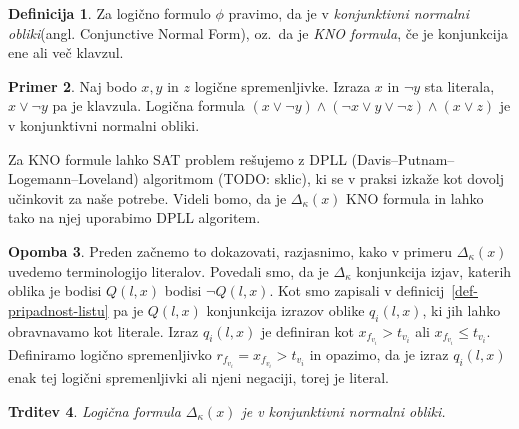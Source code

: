 \documentclass[12pt,a4paper,twoside]{article}
\theoremstyle{definition} %
\newtheorem{definicija}{Definicija}[section]
\newtheorem{primer}[definicija]{Primer}
\newtheorem{opomba}[definicija]{Opomba}
\theoremstyle{plain} %
\newtheorem{trditev}[definicija]{Trditev}
\numberwithin{equation}{section}  %
\begin{document}
\begin{definicija}
	Za logično formulo $\phi$ pravimo, da je v \emph{konjunktivni normalni obliki}(angl. Conjunctive Normal Form), 
	oz.~da je \emph{KNO formula}, če je konjunkcija ene ali več klavzul.
\end{definicija}

\begin{primer}
	Naj bodo $x,y$ in $z$ logične spremenljivke. Izraza $x$ in $\lnot y$ sta literala, $x \lor \lnot y$ pa je klavzula.
	Logična formula $(x \lor \lnot y) \land (\lnot x \lor y \lor \lnot z) \land (x \lor z)$ je v konjunktivni normalni obliki.
\end{primer}

Za KNO formule lahko SAT problem rešujemo z DPLL (Da\-vis--\-Put\-nam--\-Lo\-ge\-mann--\-Lo\-ve\-la\-nd) algoritmom (TODO: sklic), ki se v praksi izkaže kot dovolj učinkovit za naše potrebe.
Videli bomo, da je $\Delta_{\kappa}(x)$ KNO formula in lahko tako na njej uporabimo DPLL algoritem.

\begin{opomba}
\label{opomba:literal}
	Preden začnemo to dokazovati, razjasnimo, kako v primeru $\Delta_{\kappa}(x)$ uvedemo terminologijo literalov.
	Povedali smo, da je $\Delta_{\kappa}$ konjunkcija izjav, katerih oblika je bodisi $Q(l,x)$ bodisi $\lnot Q(l,x)$.
	Kot smo zapisali v definicij~\ref{def-pripadnost-listu} pa je $Q(l,x)$ konjunkcija izrazov oblike $q_i(l,x)$, ki jih lahko obravnavamo kot literale.
	Izraz $q_i(l,x)$ je definiran kot $x_{f_{v_i}} > t_{v_i}$ ali $x_{f_{v_i}} \leq t_{v_i}$.
	Definiramo logično spremenljivko $r_{f_{v_i}} = x_{f_{v_i}} > t_{v_i}$ in opazimo, 
	da je izraz $q_i(l,x)$ enak tej logični spremenljivki ali njeni negaciji, torej je literal.
\end{opomba}

\begin{trditev}
	Logična formula $\Delta_{\kappa}(x)$ je v konjunktivni normalni obliki.
\end{trditev}
\end{document}
